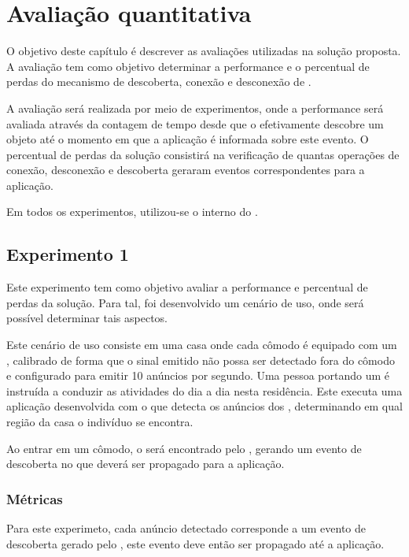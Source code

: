 \chapter{Avaliação quantitativa}\label{chap:avaliacao}

O objetivo deste capítulo é descrever as avaliações utilizadas na solução proposta. A avaliação tem como objetivo determinar a performance e o percentual de perdas do mecanismo de descoberta, conexão e desconexão de \smartobjs.

A avaliação será realizada por meio de experimentos, onde a performance será avaliada através da contagem de tempo desde que o \mhub efetivamente descobre um objeto até o momento em que a aplicação é informada sobre este evento. O percentual de perdas da solução consistirá na verificação de quantas operações de conexão, desconexão e descoberta geraram eventos correspondentes para a aplicação.

Em todos os experimentos, utilizou-se o \ubroker interno do \mhubcddl.

\section{Experimento 1}\label{chap:avaliacao-experimento1}

Este experimento tem como objetivo avaliar a performance e percentual de perdas da solução. Para tal, foi desenvolvido um cenário de uso, onde será possível determinar tais aspectos.

Este cenário de uso consiste em uma casa onde cada cômodo é equipado com um \beacon \ble, calibrado de forma que o sinal emitido não possa ser detectado fora do cômodo e configurado para emitir 10 anúncios por segundo. Uma pessoa portando um \smartphone é instruída a conduzir as atividades do dia a dia nesta residência. Este \smartphone executa uma aplicação desenvolvida com o \middleware \mhubcddl que detecta os anúncios dos \beacons, determinando em qual região da casa o indivíduo se encontra.

Ao entrar em um cômodo, o \beacon será encontrado pelo \mhubcddl, gerando um evento de descoberta no \stwopa que deverá ser propagado para a aplicação.

\subsection{Métricas}

Para este experimeto, cada anúncio detectado corresponde a um evento de descoberta gerado pelo \stwopa, este evento deve então ser propagado até a aplicação.


